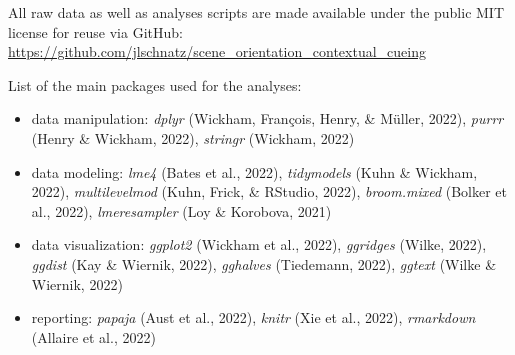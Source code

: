 \documentclass[
  man,floatsintext]{apa7}
\providecommand{\tightlist}{%
  \setlength{\itemsep}{0pt}\setlength{\parskip}{0pt}}
\begin{document}
All raw data as well as analyses scripts are made available under the public MIT license for reuse via GitHub: \url{https://github.com/jlschnatz/scene_orientation_contextual_cueing}

\noindent List of the main packages used for the analyses:

\begin{itemize}
\tightlist
\item
  data manipulation: \emph{dplyr} (Wickham, François, Henry, \& Müller, 2022), \emph{purrr} (Henry \& Wickham, 2022), \emph{stringr} (Wickham, 2022)
\item
  data modeling: \emph{lme4} (Bates et al., 2022), \emph{tidymodels} (Kuhn \& Wickham, 2022), \emph{multilevelmod} (Kuhn, Frick, \& RStudio, 2022), \emph{broom.mixed} (Bolker et al., 2022), \emph{lmeresampler} (Loy \& Korobova, 2021)
\item
  data visualization: \emph{ggplot2} (Wickham et al., 2022), \emph{ggridges} (Wilke, 2022), \emph{ggdist} (Kay \& Wiernik, 2022), \emph{gghalves} (Tiedemann, 2022), \emph{ggtext} (Wilke \& Wiernik, 2022)
\item
  reporting: \emph{papaja} (Aust et al., 2022), \emph{knitr} (Xie et al., 2022), \emph{rmarkdown} (Allaire et al., 2022)
\end{itemize}

\newpage
\end{document}
